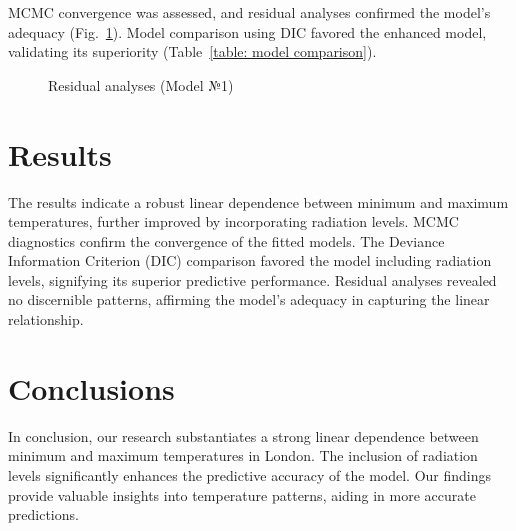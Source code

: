 \documentclass{mathreport}
\begin{document}
\newpage
MCMC convergence was assessed, and residual analyses confirmed the model's adequacy (Fig.~\ref{pic: residuals}). Model comparison using DIC favored the enhanced model, validating its superiority (Table~\ref{table: model comparison}).

\begin{figure}[H]\centering
    
    \caption{Residual analyses (Model №1)}
    \label{pic: residuals}
\end{figure}

\section{Results} 

The results indicate a robust linear dependence between minimum and maximum temperatures, further improved by incorporating radiation levels. MCMC diagnostics confirm the convergence of the fitted models. The Deviance Information Criterion (DIC) comparison favored the model including radiation levels, signifying its superior predictive performance. Residual analyses revealed no discernible patterns, affirming the model's adequacy in capturing the linear relationship.

\section{Conclusions} 

In conclusion, our research substantiates a strong linear dependence between minimum and maximum temperatures in London. The inclusion of radiation levels significantly enhances the predictive accuracy of the model. Our findings provide valuable insights into temperature patterns, aiding in more accurate predictions.
\end{document}
